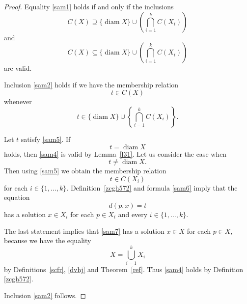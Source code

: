 \documentclass[pdflatex,sn-mathphys-num]{sn-jnl}%
\theoremstyle{thmstyleone}%
\theoremstyle{thmstyletwo}%
\theoremstyle{thmstylethree}%
\theoremstyle{thmstyletwo}%
\theoremstyle{thmstylethree}%
\begin{document}
\begin{proof}
Equality \eqref{sam1} holds if and only if the inclusions
\begin{equation}
    \label{sam2}
C(X)\supseteq \{\operatorname{diam} X\}\cup\left(\bigcap_{i=1}^{k} C(X_i)\right)
\end{equation}
and
\begin{equation}
    \label{sam3}
C(X)\subseteq \{\operatorname{diam} X\}\cup\left(\bigcap_{i=1}^{k} C(X_i)\right)
\end{equation}
are valid.

Inclusion \eqref{sam2} holds if we have the membership relation
\begin{equation}
    \label{sam4}
t\in C(X)
\end{equation}
whenever
\begin{equation}
    \label{sam5}
t \in \{\operatorname{diam} X\} \cup \left\{ \bigcap_{i=1}^{k} C(X_i) \right\}. 
\end{equation}

Let  $t$ satisfy \eqref{sam5}. If 
\begin{equation*}
    t=\operatorname{diam} X
\end{equation*}
holds, then \eqref{sam4} is valid by Lemma~\ref{l31}. Let us consider the case when 
\begin{equation*}
t \ne \operatorname{diam} X.
\end{equation*}
Then using \eqref{sam5} we obtain the membership relation
\begin{equation}
    \label{sam6}
t \in C(X_i)
\end{equation}
for each  $i\in \{1,\dots,k\}.$
Definition~\ref{zcgh572} and formula \eqref{sam6} imply that the equation
\begin{equation}
    \label{sam7}
d(p,x)=t 
\end{equation}
has a solution $x\in X_i$ for each $p\in X_i$ and every $i\in \{1,\dots,k\}$.

The last statement implies that \eqref{sam7} has a solution $x\in X$ for each $p\in X$, because we have the equality
\[
X=\bigcup_{i=1}^{k} X_i
\]
by Definitions~\ref{scfr}, \ref{dvhj} and Theorem~\ref{ref}. Thus \eqref{sam4} holds by Definition \ref{zcgh572}.

Inclusion \eqref{sam2} follows.




\end{proof}
\end{document}
